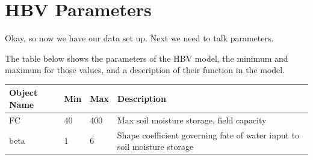 \documentclass[
]{book}
\begin{document}
\hypertarget{hbv-parameters}{%
\section{HBV Parameters}\label{hbv-parameters}}

Okay, so now we have our data set up. Next we need to talk parameters.

The table below shows the parameters of the HBV model, the minimum and maximum for those values, and a description of their function in the model.

\begin{longtable}[]{@{}llll@{}}
\toprule
\begin{minipage}[b]{0.29\columnwidth}\raggedright
Object Name\strut
\end{minipage} & \begin{minipage}[b]{0.16\columnwidth}\raggedright
Min\strut
\end{minipage} & \begin{minipage}[b]{0.13\columnwidth}\raggedright
Max\strut
\end{minipage} & \begin{minipage}[b]{0.31\columnwidth}\raggedright
Description\strut
\end{minipage}\tabularnewline
\midrule
\endhead
\begin{minipage}[t]{0.29\columnwidth}\raggedright
FC\strut
\end{minipage} & \begin{minipage}[t]{0.16\columnwidth}\raggedright
40\strut
\end{minipage} & \begin{minipage}[t]{0.13\columnwidth}\raggedright
400\strut
\end{minipage} & \begin{minipage}[t]{0.31\columnwidth}\raggedright
Max soil moisture storage, field capacity\strut
\end{minipage}\tabularnewline
\begin{minipage}[t]{0.29\columnwidth}\raggedright
beta\strut
\end{minipage} & \begin{minipage}[t]{0.16\columnwidth}\raggedright
1\strut
\end{minipage} & \begin{minipage}[t]{0.13\columnwidth}\raggedright
6\strut
\end{minipage} & \begin{minipage}[t]{0.31\columnwidth}\raggedright
Shape coefficient governing fate of water input to soil moisture storage\strut

\end{minipage}
\end{longtable}
\end{document}
